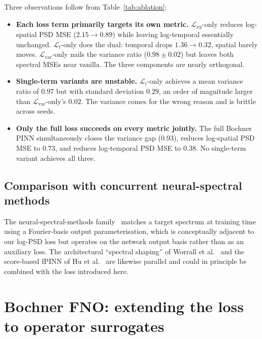 \documentclass[review,12pt]{elsarticle}
\begin{document}
Three observations follow from Table~\ref{tab:ablation}:
\begin{itemize}
\item \textbf{Each loss term primarily targets its own metric.}
$\mathcal{L}_{xy}$-only reduces log-spatial PSD MSE
($2.15 \to 0.89$) while leaving log-temporal essentially unchanged.
$\mathcal{L}_{t}$-only does the dual: temporal drops
$1.36 \to 0.32$, spatial barely moves.
$\mathcal{L}_{\mathrm{var}}$-only nails the variance ratio
($0.98 \pm 0.02$) but leaves both spectral MSEs near vanilla.
The three components are nearly orthogonal.

\item \textbf{Single-term variants are unstable.}
$\mathcal{L}_{t}$-only achieves a mean variance ratio of $0.97$
but with standard deviation $0.29$, an order of magnitude larger
than $\mathcal{L}_{\mathrm{var}}$-only's $0.02$. The variance
comes for the wrong reason and is brittle across seeds.

\item \textbf{Only the full loss succeeds on every metric jointly.}
The full Bochner PINN simultaneously closes the variance gap
($0.93$), reduces log-spatial PSD MSE to $0.73$, and reduces
log-temporal PSD MSE to $0.38$. No single-term variant achieves
all three.
\end{itemize}

\subsection{Comparison with concurrent neural-spectral methods}
\label{subsec:concurrent}

The neural-spectral-methods family~\cite{DuEtAl2024NSM} matches a
target spectrum at training time using a Fourier-basis output
parameterisation, which is conceptually adjacent to our log-PSD
loss but operates on the network output basis rather than as an
auxiliary loss. The
architectural ``spectral shaping'' of Worrall et
al.~\cite{Worrall2025SpectralShaping} and the score-based fPINN
of Hu et al.~\cite{Hu2024ScoreFPINN} are likewise parallel and
could in principle be combined with the loss introduced here.


\section{Bochner FNO: extending the loss to operator surrogates}
\label{sec:spectral-fno}
\end{document}
